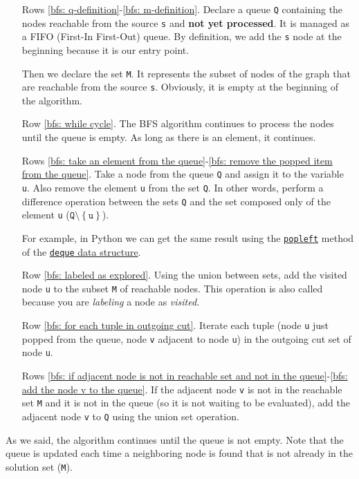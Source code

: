 \begin{itemize}
    \item[Rows \ref{bfs: q-definition}-\ref{bfs: m-definition}.] Declare a queue \texttt{Q} containing the nodes reachable from the source \texttt{s} and \textbf{not yet processed}. It is managed as a FIFO (First-In First-Out) queue. By definition, we add the \texttt{s} node at the beginning because it is our entry point.
    
    Then we declare the set \texttt{M}. It represents the subset of nodes of the graph that are reachable from the source \texttt{s}. Obviously, it is empty at the beginning of the algorithm.

    \item[Row \ref{bfs: while cycle}.] The BFS algorithm continues to process the nodes until the queue is empty. As long as there is an element, it continues.
    
    \item[Rows \ref{bfs: take an element from the queue}-\ref{bfs: remove the popped item from the queue}.] Take a node from the queue \texttt{Q} and assign it to the variable \texttt{u}. Also remove the element \texttt{u} from the set \texttt{Q}. In other words, perform a difference operation between the sets \texttt{Q} and the set composed only of the element \texttt{u} ($\texttt{Q} \setminus \left\{\texttt{u}\right\}$).
    
    For example, in Python we can get the same result using the \href{https://docs.python.org/3/library/collections.html#collections.deque.popleft}{\texttt{popleft}} method of the \href{https://docs.python.org/3/tutorial/datastructures.html#using-lists-as-queues}{\texttt{deque} data structure}.

    \item[Row \ref{bfs: labeled as explored}.] Using the union between sets, add the visited node \texttt{u} to the subset \texttt{M} of reachable nodes. This operation is also called  because you are \emph{labeling} a node as \emph{visited}.
    
    \item[Row \ref{bfs: for each tuple in outgoing cut}.] Iterate each tuple (node \texttt{u} just popped from the queue, node \texttt{v} adjacent to node \texttt{u}) in the outgoing cut set of node \texttt{u}.
    
    \item[Rows \ref{bfs: if adjacent node is not in reachable set and not in the queue}-\ref{bfs: add the node v to the queue}.] If the adjacent node \texttt{v} is not in the reachable set \texttt{M} and it is not in the queue (so it is not waiting to be evaluated), add the adjacent node \texttt{v} to \texttt{Q} using the union set operation.
\end{itemize}
As we said, the algorithm continues until the queue is not empty. Note that the queue is updated each time a neighboring node is found that is not already in the solution set (\texttt{M}).